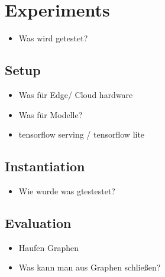 \chapter{Experiments}
\begin{itemize}
    \item Was wird getestet?
\end{itemize}
\section{Setup}
\begin{itemize}
    \item Was für Edge/ Cloud hardware
    \item Was für Modelle?
    \item tensorflow serving / tensorflow lite
\end{itemize}
\section{Instantiation}
\begin{itemize}
    \item Wie wurde was gtestestet?
\end{itemize}
\section{Evaluation}
\begin{itemize}
    \item Haufen Graphen
    \item Was kann man aus Graphen schließen?
\end{itemize}
\endinput 
